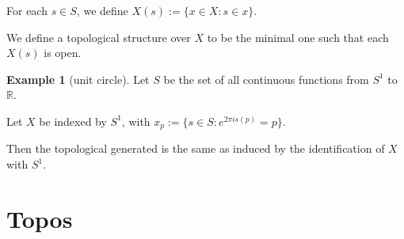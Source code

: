 \documentclass[11pt, oneside]{article}   	%
\theoremstyle{definition}
\newtheorem*{eg}{Example}
\begin{document}
For each $s\in S$, we define $X(s):= \{x\in X:s\in x\}$.

We define a topological structure over $X$ to be the minimal one such that each $X(s)$ is open.

\begin{eg}
	[unit circle]

	Let $S$ be the set of all continuous functions from $S^1$ to $\mathbb{R}$.

	Let $X$ be indexed by $S^1$, with $x_{p}:= \{s\in S: e^{2 \pi i s(p)} = p\}$.

	Then the topological generated is the same as induced by the identification of $X$ with $S^1$.
\end{eg}

\section{Topos}
\end{document}
